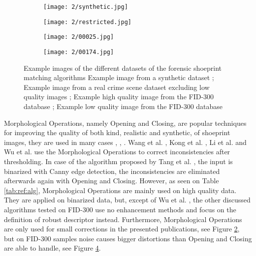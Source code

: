 \documentclass[draft,final]{vutinfth} %
\begin{document}
\begin{figure}[h]
  \centering
  \begin{subfigure}[t]{0.24\columnwidth}
    \centering
    \texttt{[image: 2/synthetic.jpg]}
    \subcaption{}
    \label{fig:rw:synthetic}
  \end{subfigure}
  \begin{subfigure}[t]{0.24\columnwidth}
    \centering
    \texttt{[image: 2/restricted.jpg]}
    \subcaption{}
    \label{fig:rw:restricted}
  \end{subfigure}
  \begin{subfigure}[t]{0.24\columnwidth}
    \centering
    \texttt{[image: 2/00025.jpg]}
    \subcaption{}
    \label{fig:rw:highFID}
  \end{subfigure}
  \begin{subfigure}[t]{0.24\columnwidth}
    \centering
    \texttt{[image: 2/00174.jpg]}
    \subcaption{}
    \label{fig:rw:lowFID}
  \end{subfigure}
  \caption{Example images of the different datasets of the forensic shoeprint matching algorithms
	 Example image from a synthetic dataset \cite{alizadeh2017automatic};  Example image from a real crime scene dataset excluding low quality images \cite{li2014retrieval};  Example high quality image from the FID-300 database \cite{kortylewski2014unsupervised};  Example low quality image from the FID-300 database \cite{kortylewski2014unsupervised}}
  \label{fig:rw:database}
\end{figure}


\par
Morphological Operations, namely Opening and Closing, are popular techniques for improving the quality of both kind, realistic and synthetic, of shoeprint images, they are  used in many cases \cite{wang2014automatic}, \cite{kong2014novel}, \cite{li2014retrieval}.
Wang et al. \cite{wang2014automatic}, Kong et al.  \cite{kong2014novel}, Li et al. \cite{li2014retrieval} and  Wu et al. \cite{wu2019crime}use the Morphological Operations to correct inconsistencies after thresholding.
In case of the algorithm proposed by Tang et al. \cite{tang2010footwear}, the input is binarized with Canny edge detection, the inconsistencies are eliminated afterwards again with Opening and Closing.
However, as seen on Table \ref{tab:ref:alg}, Morphological Operations are mainly used on high quality data.
They are applied on binarized data, but, except of Wu et al. \cite{wu2019crime}, the other discussed algorithms tested on FID-300 use no enhancement methods and focus on the definition of robust descriptor instead.
Furthermore, Morphological Operations are only used for small corrections in the presented publications, see Figure \ref{fig:rw:restricted}, but on FID-300 samples noise causes bigger distortions than Opening and Closing are able to handle, see Figure \ref{fig:rw:lowFID}.
\end{document}
